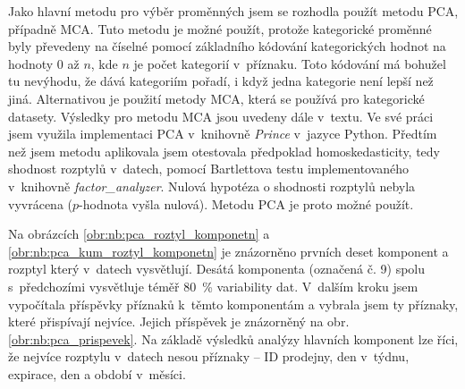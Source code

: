 Jako hlavní metodu pro výběr proměnných jsem se rozhodla použít metodu PCA, případně MCA. Tuto metodu je možné použít, protože kategorické proměnné byly převedeny na číselné pomocí základního kódování kategorických hodnot na hodnoty 0 až $n$, kde $n$ je počet kategorií v~příznaku. Toto kódování má bohužel tu nevýhodu, že dává kategoriím pořadí, i když jedna kategorie není lepší než jiná. Alternativou je použití metody MCA, která se používá pro kategorické datasety. Výsledky pro metodu MCA jsou uvedeny dále v~textu.
Ve své práci jsem využila implementaci PCA v~knihovně \emph{Prince} v~jazyce Python. 
Předtím než jsem metodu aplikovala jsem otestovala předpoklad homoskedasticity, tedy shodnost rozptylů v~datech, pomocí Bartlettova testu implementovaného v~knihovně \emph{factor\_analyzer}. Nulová hypotéza o shodnosti rozptylů nebyla vyvrácena ($p$-hodnota vyšla nulová). Metodu PCA je proto možné použít.

Na obrázcích \ref*{obr:nb:pca_roztyl_komponetn} a \ref*{obr:nb:pca_kum_roztyl_komponetn} je znázorněno prvních deset komponent a rozptyl který v~datech vysvětlují. 
Desátá komponenta (označená č. 9) spolu s~předchozími vysvětluje téměř 80~\% variability dat. V~dalším kroku jsem vypočítala příspěvky příznaků k~těmto komponentám a vybrala jsem ty příznaky, které přispívají nejvíce. Jejich příspěvek je znázorněný na obr. \ref*{obr:nb:pca_prispevek}. Na základě výsledků analýzy hlavních komponent lze říci, že nejvíce rozptylu v~datech nesou příznaky -- ID prodejny, den v~týdnu, expirace, den a období v~měsíci.

